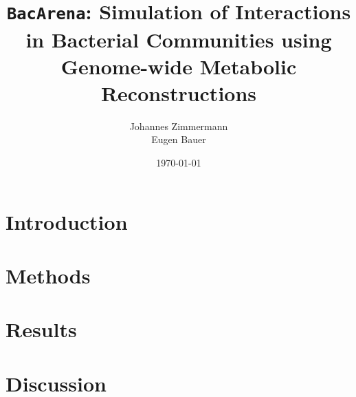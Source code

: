 \documentclass{scrartcl}
\title{\texttt{BacArena}: Simulation of Interactions in Bacterial Communities using Genome-wide Metabolic Reconstructions}
\author{Johannes Zimmermann\\Eugen Bauer}
\date{\today}
\begin{document}
\maketitle
\tableofcontents

\section{Introduction}


\section{Methods}


\section{Results}


\section{Discussion}

  

\printbibliography 
\end{document}
